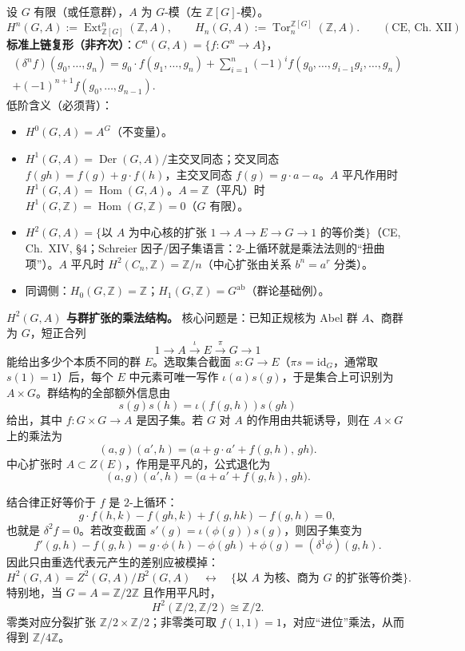 \documentclass[12pt,a4paper]{ctexart}
\DeclareMathOperator{\Hom}{Hom}
\DeclareMathOperator{\Ext}{Ext}
\DeclareMathOperator{\Tor}{Tor}
\DeclareMathOperator{\Der}{Der}
\newcommand{\keypoint}{\text{\textbf{\ensuremath{\bigstar}}\;}}
\begin{document}
设 $G$ 有限（或任意群），$A$ 为 $G$-模（左 $\mathbb Z[G]$-模）。
\[
  H^n(G,A):=\Ext^n_{\mathbb Z[G]}(\mathbb Z,A),\qquad
  H_n(G,A):=\Tor_n^{\mathbb Z[G]}(\mathbb Z,A).
  \qquad(\text{CE, Ch.~XII})
\]
\textbf{标准上链复形（非齐次）}：$C^n(G,A)=\{f\colon G^n\to A\}$，
\begin{multline*}
  (\delta^n f)(g_0,\dots,g_n)
  =g_0\cdot f(g_1,\dots,g_n)
  +\sum_{i=1}^{n}(-1)^i f(g_0,\dots,g_{i-1}g_i,\dots,g_n)\\
  +(-1)^{n+1}f(g_0,\dots,g_{n-1}).
\end{multline*}
\keypoint 低阶含义（必须背）：
\begin{itemize}
  \item $H^0(G,A)=A^G$（不变量）。
  \item $H^1(G,A)=\Der(G,A)/\text{主交叉同态}$；交叉同态 $f(gh)=f(g)+g\cdot f(h)$，主交叉同态 $f(g)=g\cdot a-a$。$A$ 平凡作用时 $H^1(G,A)=\Hom(G,A)$。$A=\mathbb Z$（平凡）时 $H^1(G,\mathbb Z)=\Hom(G,\mathbb Z)=0$（$G$ 有限）。
  \item $H^2(G,A)=\{$以 $A$ 为中心核的扩张 $1\to A\to E\to G\to1$ 的等价类$\}$（CE, Ch.~XIV, \S4；Schreier 因子/因子集语言：$2$-上循环就是乘法法则的“扭曲项”）。$A$ 平凡时 $H^2(C_n,\mathbb Z)=\mathbb Z/n$（中心扩张由关系 $b^n=a^r$ 分类）。
  \item 同调侧：$H_0(G,\mathbb Z)=\mathbb Z$；$H_1(G,\mathbb Z)=G^{\mathrm{ab}}$（群论基础例）。
\end{itemize}

\textbf{\(H^2(G,A)\) 与群扩张的乘法结构。}
核心问题是：已知正规核为 Abel 群 \(A\)、商群为 \(G\)，短正合列
\[
  1\longrightarrow A\xrightarrow{\iota}E\xrightarrow{\pi}G\longrightarrow 1
\]
能给出多少个本质不同的群 \(E\)。选取集合截面 \(s\colon G\to E\)（\(\pi s=\mathrm{id}_G\)，通常取 \(s(1)=1\)）后，每个 \(E\) 中元素可唯一写作 \(\iota(a)s(g)\)，于是集合上可识别为 \(A\times G\)。群结构的全部额外信息由
\[
  s(g)s(h)=\iota(f(g,h))s(gh)
\]
给出，其中 \(f\colon G\times G\to A\) 是因子集。若 \(G\) 对 \(A\) 的作用由共轭诱导，则在 \(A\times G\) 上的乘法为
\[
  (a,g)(a',h)=\bigl(a+g\cdot a'+f(g,h),\,gh\bigr).
\]
中心扩张时 \(A\subset Z(E)\)，作用是平凡的，公式退化为
\[
  (a,g)(a',h)=\bigl(a+a'+f(g,h),\,gh\bigr).
\]

结合律正好等价于 \(f\) 是 \(2\)-上循环：
\[
  g\cdot f(h,k)-f(gh,k)+f(g,hk)-f(g,h)=0,
\]
也就是 \(\delta^2 f=0\)。若改变截面 \(s'(g)=\iota(\phi(g))s(g)\)，则因子集变为
\[
  f'(g,h)-f(g,h)=g\cdot\phi(h)-\phi(gh)+\phi(g)=(\delta^1\phi)(g,h).
\]
因此只由重选代表元产生的差别应被模掉：
\[
  H^2(G,A)=Z^2(G,A)/B^2(G,A)
  \quad\leftrightarrow\quad
  \{\text{以 }A\text{ 为核、商为 }G\text{ 的扩张等价类}\}.
\]
特别地，当 \(G=A=\mathbb Z/2\mathbb Z\) 且作用平凡时，
\[
  H^2(\mathbb Z/2,\mathbb Z/2)\cong\mathbb Z/2.
\]
零类对应分裂扩张 \(\mathbb Z/2\times\mathbb Z/2\)；非零类可取 \(f(1,1)=1\)，对应“进位”乘法，从而得到 \(\mathbb Z/4\mathbb Z\)。
\end{document}
